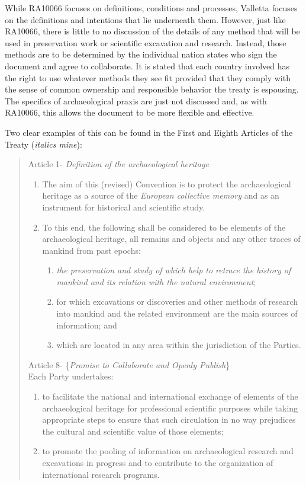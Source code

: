 While RA10066 focuses on definitions, conditions and processes, Valletta focuses on the definitions and intentions that lie underneath them. However, just like RA10066, there is little to no discussion of the details of any method that will be used in preservation work or scientific excavation and research. Instead, those methods are to be determined by the individual nation states who sign the document and agree to collaborate. It is stated that each country involved has the right to use whatever methods they see fit provided that they comply with the sense of common ownership and responsible behavior the treaty is espousing. The specifics of archaeological praxis are just not discussed and, as with RA10066, this allows the document to be more flexible and effective. 

Two clear examples of this can be found in the First and Eighth Articles of the Treaty (\textit{italics mine}): 

\begin{quote}
	Article 1- \textit{Definition of the archaeological heritage}
	\begin{enumerate}
		\item The aim of this (revised) Convention is to protect the archaeological heritage as a source of the \textit{European collective memory} and as an instrument for historical and scientific study.
		\item To this end, {the following} shall be considered to be elements of the archaeological heritage, all remains and objects and any other traces of mankind from past epochs:
		\begin{enumerate}
			\item \textit{the preservation and study of which help to retrace the history of mankind and its relation with the natural environment};
			\item for which excavations or discoveries and other methods of research into mankind and the related environment are the main sources of information; and
			\item which are located in any area within the jurisdiction of the Parties. \parencite[2]{Valletta_1992}
		\end{enumerate}
	\end{enumerate}
	Article 8- \{\textit{Promise to Collaborate and Openly Publish}\}\\
	Each Party undertakes:
	\begin{enumerate}
		\item to facilitate the national and international exchange of elements of the archaeological heritage for professional scientific purposes while taking appropriate steps to ensure that such circulation in no way prejudices the cultural and scientific value of those elements;
		\item to promote the pooling of information on archaeological research and excavations in progress and to contribute to the organization of international research programs. \parencite[4]{Valletta_1992}
	\end{enumerate}
\end{quote}

